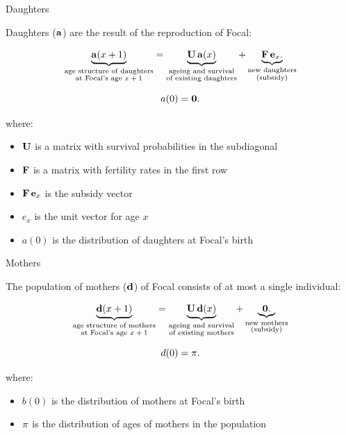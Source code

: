 ﻿\documentclass{beamer}
\begin{document}
\begin{frame}{Daughters}

Daughters ($\bf a$) are the result of the reproduction of Focal:

    \begin{equation}
    	\underbrace{{\bf a}(x+1)}_{\substack{\text{age structure of daughters}\\ \text{at Focal's age $x+1$}}} = 	
    \underbrace{{\bf U \, a}(x)}_{\substack{\text{ageing and survival}\\ \text{of existing daughters}}}
    + 	\underbrace{	{\bf F \, e}_x.}_{\substack{\text{new daughters}\\ \text{(subsidy)}}}
\end{equation}

\begin{equation*}
    a(0) = {\bf 0}.
\end{equation*}

where:
\begin{itemize}
    \item ${\bf U}$ is a matrix with survival probabilities in the subdiagonal
    \item ${\bf F}$ is a matrix with fertility rates in the first row
    \item ${\bf F \, e}_x$ is the subsidy vector
    \item $e_x$ is the unit vector for age $x$
    \item $a(0)$ is the distribution of daughters at Focal's birth
\end{itemize}

\end{frame}

\begin{frame}{Mothers}

 The population of mothers ($\bf d$) of Focal consists of at most a single
individual:

    \begin{equation}
    	\underbrace{{\bf d}(x+1)}_{\substack{\text{age structure of mothers}\\ \text{at Focal's age $x+1$}}} = 	
    \underbrace{{\bf U \, d}(x)}_{\substack{\text{ageing and survival}\\ \text{of existing mothers}}}
    + 	\underbrace{	{\bf 0}.}_{\substack{\text{new mothers}\\ \text{(subsidy)}}}
\end{equation}

\begin{equation*}
    d(0) = {\bf \pi}.
\end{equation*}

where:
\begin{itemize}
    \item $b(0)$ is the distribution of mothers at Focal's birth
    \item ${\bf \pi}$ is the distribution of ages of mothers in the population
\end{itemize}

\end{frame}
\end{document}
